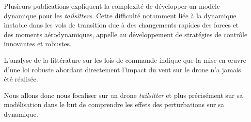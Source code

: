 Plusieurs publications expliquent la complexité de développer un modèle dynamique pour les \textit{tailsitters}. Cette difficulté notamment liée à la dynamique instable dans les vols de transition due à des changements rapides des forces et des moments aérodynamiques, appelle au développement de stratégies de contrôle innovantes et robustes. 

L'analyse de la littérature sur les lois de commande indique que la mise en œuvre d'une loi robuste abordant directement l'impact du vent sur le drone n'a jamais été réalisée.

Nous allons donc nous focaliser sur un drone \textit{tailsitter} et plus précisément sur sa modélisation dans le but de comprendre les effets des perturbations sur sa dynamique.
